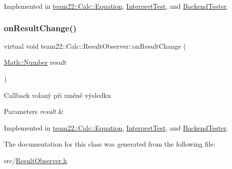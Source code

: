 Implemented in \hyperlink{classteam22_1_1_calc_1_1_equation_a4e7a0614867931bcc714440441cdd894}{team22\+::\+Calc\+::\+Equation}, \hyperlink{struct_interpret_test_a8dd2550d1b3e604db0230c2a3f4807a5}{Interpret\+Test}, and \hyperlink{class_backend_tester_a9f83f432f7d71304026ff07caf20a65d}{Backend\+Tester}.

\mbox{\label{classteam22_1_1_calc_1_1_result_observer_aa04007df3aa8a499c3a511f549238285}} 
\subsubsection{\texorpdfstring{on\+Result\+Change()}{onResultChange()}}
{\footnotesize\ttfamily virtual void team22\+::\+Calc\+::\+Result\+Observer\+::on\+Result\+Change (\begin{DoxyParamCaption}\item[{\hyperlink{classteam22_1_1_math_1_1_number}{Math\+::\+Number}}]{result }\end{DoxyParamCaption})\hspace{0.3cm}{\ttfamily [pure virtual]}}

Callback volaný při změně výsledku 
\begin{DoxyParams}{Parameters}
{\em result} & \\
\hline
\end{DoxyParams}


Implemented in \hyperlink{classteam22_1_1_calc_1_1_equation_a302c295e099f589897a1bad4b02d3de8}{team22\+::\+Calc\+::\+Equation}, \hyperlink{struct_interpret_test_af3c7dfecc5779919bf629c558c696548}{Interpret\+Test}, and \hyperlink{class_backend_tester_af84da1816cef621e57c65a01aa26d66e}{Backend\+Tester}.



The documentation for this class was generated from the following file\+:\begin{DoxyCompactItemize}
\item 
src/\hyperlink{_result_observer_8h}{Result\+Observer.\+h}\end{DoxyCompactItemize}
